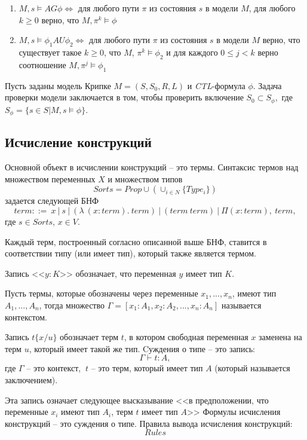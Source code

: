 \documentclass[12pt]{article}
\begin{document}
\begin{enumerate}
    \item $M, s \vDash AG\phi \Leftrightarrow$ для любого пути $\pi$ из состояния $s$ в модели $M$, для любого $k \geq 0$ верно, что $M, \pi^{k} \vDash \phi$ 
    
    \item $M, s \vDash \phi_1 AU \phi_2 \Leftrightarrow$ для любого пути $\pi$ из состояния $s$ в модели $M$ верно, что существует такое $k \geq 0$, что $M$, $\pi^{k} \vDash \phi_2$ и для каждого $0 \leq j < k$ верно соотношение $M, \pi^{j} \vDash \phi_1$
    
\end{enumerate}

Пусть заданы модель Крипке $M = (S, S_0, R, L)$ и \textit{CTL}-формула $\phi$. Задача проверки модели заключается в том, чтобы проверить включение $S_0 \subset S_{\phi},$ где $S_{\phi} = \{s \in S | M,s \vDash \phi \}$. 


\subsection{Исчисление конструкций}
Основной объект в исчислении конструкций -- это термы.
Синтаксис термов над множеством переменных $X$ 
и множеством типов 
$$Sorts={Prop} \cup (\cup_{i \in N} \{Type_i\})$$
задается следующей БНФ 
$$term ::=\ x\ |\ s\ |\ (\lambda\ (x : term).\ term)\ |\ (term\ term)\ |\ \Pi (x:term),\ term,$$ 
где $s \in Sorts$, $x \in V$.

Каждый терм, построенный согласно описанной выше БНФ, 
ставится в соответствии типу (или имеет тип), который также является термом.

Запись <<$y:K$>> обозначает, что переменная $y$ имеет тип $K$.

Пусть термы, которые обозначены через переменные $x_1, ..., x_n$, 
имеют тип $A_1, ..., A_n$, тогда множество $\Gamma = [x_1:A_1, x_2:A_2, ..., x_n: A_n]$ называется контекстом.

Запись $t\{x/u\}$ обозначает терм $t$, в котором свободная переменная $x$ заменена на терм $u$, который имеет такой же тип.
Cуждения о типе -- это запись:
$$\Gamma \vdash t: A,$$ 
где $\Gamma$ -- это контекст, $\ t$ -- это терм, который имеет тип $A$ (который называется заключением).

Эта запись означает следующее высказывание
<<в предположении, 
что переменные $x_i$ имеют тип $A_i$, терм $t$ имеет тип $A$>>
Формулы исчисления конструкций -- это суждения о типе.
Правила вывода исчисления конструкций:
$$Rules$$
\end{document}
